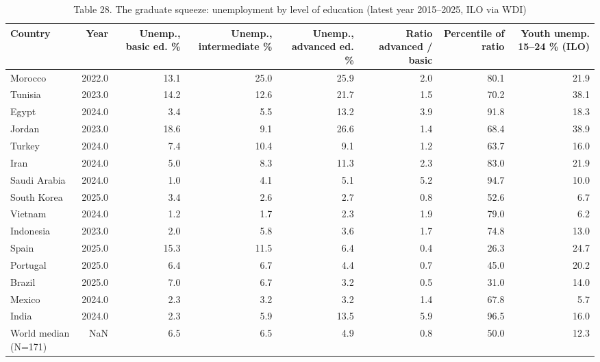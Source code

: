 \begin{table}
\caption{Table 28. The graduate squeeze: unemployment by level of education (latest year 2015–2025, ILO via WDI)}
\label{tab:T28_educated_unemployment}
\begin{tabular}{lrrrrrrr}
\toprule
Country & Year & Unemp., basic ed. \% & Unemp., intermediate \% & Unemp., advanced ed. \% & Ratio advanced / basic & Percentile of ratio & Youth unemp. 15–24 \% (ILO) \\
\midrule
Morocco & 2022.0 & 13.1 & 25.0 & 25.9 & 2.0 & 80.1 & 21.9 \\
Tunisia & 2023.0 & 14.2 & 12.6 & 21.7 & 1.5 & 70.2 & 38.1 \\
Egypt & 2024.0 & 3.4 & 5.5 & 13.2 & 3.9 & 91.8 & 18.3 \\
Jordan & 2023.0 & 18.6 & 9.1 & 26.6 & 1.4 & 68.4 & 38.9 \\
Turkey & 2024.0 & 7.4 & 10.4 & 9.1 & 1.2 & 63.7 & 16.0 \\
Iran & 2024.0 & 5.0 & 8.3 & 11.3 & 2.3 & 83.0 & 21.9 \\
Saudi Arabia & 2024.0 & 1.0 & 4.1 & 5.1 & 5.2 & 94.7 & 10.0 \\
South Korea & 2025.0 & 3.4 & 2.6 & 2.7 & 0.8 & 52.6 & 6.7 \\
Vietnam & 2024.0 & 1.2 & 1.7 & 2.3 & 1.9 & 79.0 & 6.2 \\
Indonesia & 2023.0 & 2.0 & 5.8 & 3.6 & 1.7 & 74.8 & 13.0 \\
Spain & 2025.0 & 15.3 & 11.5 & 6.4 & 0.4 & 26.3 & 24.7 \\
Portugal & 2025.0 & 6.4 & 6.7 & 4.4 & 0.7 & 45.0 & 20.2 \\
Brazil & 2025.0 & 7.0 & 6.7 & 3.2 & 0.5 & 31.0 & 14.0 \\
Mexico & 2024.0 & 2.3 & 3.2 & 3.2 & 1.4 & 67.8 & 5.7 \\
India & 2024.0 & 2.3 & 5.9 & 13.5 & 5.9 & 96.5 & 16.0 \\
World median (N=171) & NaN & 6.5 & 6.5 & 4.9 & 0.8 & 50.0 & 12.3 \\
\bottomrule
\end{tabular}
\end{table}
